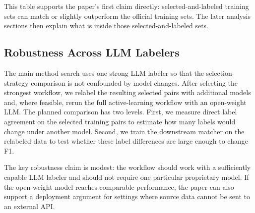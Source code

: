 This table supports the paper's first claim directly: selected-and-labeled training sets can match or slightly outperform the official training sets. The later analysis sections then explain what is inside those selected-and-labeled sets.

\subsection{Robustness Across LLM Labelers}

The main method search uses one strong LLM labeler so that the selection-strategy comparison is not confounded by model changes. After selecting the strongest workflow, we relabel the resulting selected pairs with additional models and, where feasible, rerun the full active-learning workflow with an open-weight LLM. The planned comparison has two levels. First, we measure direct label agreement on the selected training pairs to estimate how many labels would change under another model. Second, we train the downstream matcher on the relabeled data to test whether these label differences are large enough to change F1.

The key robustness claim is modest: the workflow should work with a sufficiently capable LLM labeler and should not require one particular proprietary model. If the open-weight model reaches comparable performance, the paper can also support a deployment argument for settings where source data cannot be sent to an external API.
